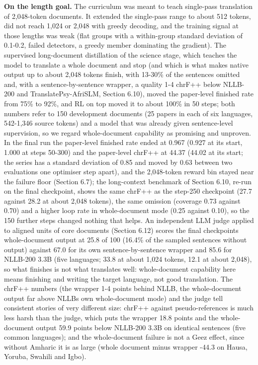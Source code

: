 \textbf{On the length goal.} The curriculum was meant to teach single-pass translation of 2,048-token documents. It extended the single-pass range to about 512 tokens, did not reach 1,024 or 2,048 with greedy decoding, and the training signal at those lengths was weak (flat groups with a within-group standard deviation of 0.1-0.2, failed detectors, a greedy member dominating the gradient). The supervised long-document distillation of the science stage, which teaches the model to translate a whole document and stop (and which is what makes native output up to about 2,048 tokens finish, with 13-30\% of the sentences omitted and, with a sentence-by-sentence wrapper, a quality 1-4 chrF++ below NLLB-200 and TranslatePsy-AfriSLM, Section 6.10), moved the paper-level finished rate from 75\% to 92\%, and RL on top moved it to about 100\% in 50 steps; both numbers refer to 150 development documents (25 papers in each of six languages, 542-1,346 source tokens) and a model that was already given sentence-level supervision, so we regard whole-document capability as promising and unproven. In the final run the paper-level finished rate ended at 0.967 (0.927 at its start, 1.000 at steps 50-300) and the paper-level chrF++ at 44.37 (44.02 at its start; the series has a standard deviation of 0.85 and moved by 0.63 between two evaluations one optimiser step apart), and the 2,048-token reward bin stayed near the failure floor (Section 6.7); the long-context benchmark of Section 6.10, re-run on the final checkpoint, shows the same chrF++ as the step-250 checkpoint (27.7 against 28.2 at about 2,048 tokens), the same omission (coverage 0.73 against 0.70) and a higher loop rate in whole-document mode (0.25 against 0.10), so the 150 further steps changed nothing that helps. An independent LLM judge applied to aligned units of core documents (Section 6.12) scores the final checkpoint\textquotesingle s whole-document output at 25.8 of 100 (16.4\% of the sampled sentences without output) against 67.0 for its own sentence-by-sentence wrapper and 85.6 for NLLB-200 3.3B (five languages; 33.8 at about 1,024 tokens, 12.1 at about 2,048), so what finishes is not what translates well: whole-document capability here means finishing and writing the target language, not good translation. The chrF++ numbers (the wrapper 1-4 points behind NLLB, the whole-document output far above NLLB\textquotesingle s own whole-document mode) and the judge tell consistent stories of very different size: chrF++ against pseudo-references is much less harsh than the judge, which puts the wrapper 18.8 points and the whole-document output 59.9 points below NLLB-200 3.3B on identical sentences (five common languages); and the whole-document failure is not a Ge\textquotesingle ez effect, since without Amharic it is as large (whole document minus wrapper -44.3 on Hausa, Yoruba, Swahili and Igbo).


